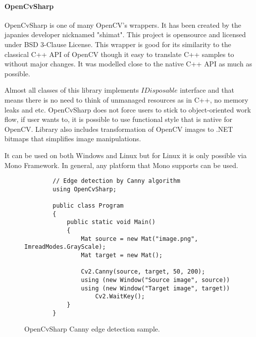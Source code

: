 \documentclass[../../../../main]{subfiles}
\begin{document}
\paragraph{OpenCvSharp}

OpenCvSharp is one of many {\Csharp} OpenCV's wrappers. It has been created by the japanies developer nicknamed "shimat". This project is opensource and licensed under BSD 3-Clause License. This wrapper is good for its similarity to the classical C++ \ac{API} of \ac{OpenCV} though it easy to translate C++ samples to {\Csharp} without major changes. It was modelled close to the native C++ \ac{API} as much as possible.

Almost all classes of this library implements $IDisposable$ interface and that means there is no need to think of unmanaged resources as in C++, no memory leaks and etc. OpenCvSharp does not force users to stick to object-oriented work flow, if user wants to, it is possible to use functional style that is native for \ac{OpenCV}. Library also includes transformation of \ac{OpenCV} images to .NET bitmaps that simplifies image manipulations.

It can be used on both Windows and Linux but for Linux it is only possible via Mono Framework. In general, any platform that Mono supports can be used.

\begin{figure} [!ht]
  \centering    
    \lstset{style=sharpc}
        \begin{lstlisting}
        // Edge detection by Canny algorithm
        using OpenCvSharp;
        
        public class Program 
        {
            public static void Main() 
            {
                Mat source = new Mat("image.png", ImreadModes.GrayScale);
                Mat target = new Mat();
                
                Cv2.Canny(source, target, 50, 200);
                using (new Window("Source image", source)) 
                using (new Window("Target image", target)) 
                    Cv2.WaitKey();
            }
        }
        \end{lstlisting}
  \caption{OpenCvSharp Canny edge detection sample.}
  \label{opencvsharpcanny}
\end{figure}
\end{document}
